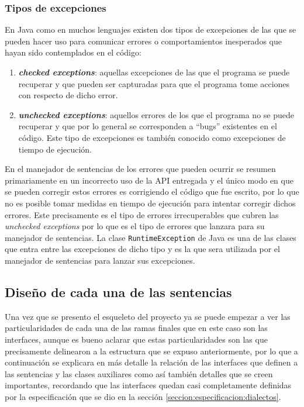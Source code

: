 \subsubsection{Tipos de excepciones}
En Java como en muchos lenguajes existen dos tipos de excepciones de las que se pueden hacer uso\citep{java:exeptions} para comunicar errores o comportamientos inesperados que hayan sido contemplados en el código:
\begin{enumerate}
\item \textbf{\textit{checked exceptions}}: aquellas excepciones de las que el programa se puede recuperar y que pueden ser capturadas para que el programa tome acciones con respecto de dicho error.
%
\item \textbf{\textit{unchecked exceptions}}: aquellos errores de los que el programa no se puede recuperar y que por lo general se corresponden a ``bugs'' existentes en el código. Este tipo de excepciones es también conocido como excepciones de tiempo de ejecución.
\end{enumerate}
%
En el manejador de sentencias de \jj los errores que pueden ocurrir se resumen primariamente en un incorrecto uso de la API entregada y el único modo en que se pueden corregir estos errores es corrigiendo el código que fue escrito, por lo que no es posible tomar medidas en tiempo de ejecución para intentar corregir dichos errores. Este precisamente es el tipo de errores irrecuperables que cubren las \textit{unchecked exceptions} por lo que es el tipo de errores que lanzara \jj para su manejador de sentencias. La clase \verb=RuntimeException= de Java es una de las clases que entra entre las excepciones de dicho tipo y es la que sera utilizada por el manejador de sentencias para lanzar sus excepciones.
%
\subsection{Diseño de cada una de las sentencias}
Una vez que se presento el esqueleto del proyecto ya se puede empezar a ver las particularidades de cada una de las ramas finales que en este caso son las interfaces, aunque es bueno aclarar que estas particularidades son las que precisamente delinearon a la estructura que se expuso anteriormente, por lo que a continuación se explicara en más detalle la relación de las interfaces que definen a las sentencias y las clases auxiliares como así también detalles que se creen importantes, recordando que las interfaces quedan casi completamente definidas por la especificación que se dio en la sección \ref{seccion:especificacion:dialectos}.
%
